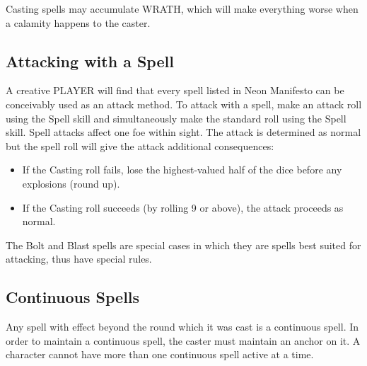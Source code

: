 Casting spells may accumulate WRATH, which will make everything worse when a calamity happens to the caster.

\subsection{Attacking with a Spell}
A creative PLAYER will find that every spell listed in Neon Manifesto can be conceivably used as an attack method. To attack with a spell, make an attack roll using the Spell skill and simultaneously make the standard roll using the Spell skill. Spell attacks affect one foe within sight. The attack is determined as normal but the spell roll will give the attack additional consequences:
\begin{itemize}
    \item If the Casting roll fails, lose the highest-valued half of the dice before any explosions (round up).
    \item If the Casting roll succeeds (by rolling 9 or above), the attack proceeds as normal.
\end{itemize}

The Bolt and Blast spells are special cases in which they are spells best suited for attacking, thus have special rules.

\subsection{Continuous Spells}
Any spell with effect beyond the round which it was cast is a continuous spell. In order to maintain a continuous spell, the caster must maintain an anchor on it. A character cannot have more than one continuous spell active at a time.


